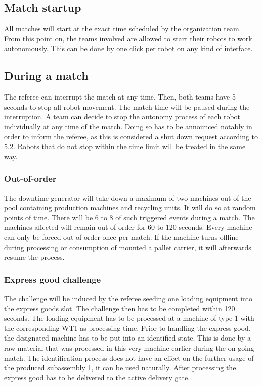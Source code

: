 \documentclass[12pt,twoside]{article}
\begin{document}
\subsection{Match startup}

All matches will start at the exact time scheduled by the organization
team. From this point on, the teams involved are allowed to start
their robots to work autonomously. This can be done by one click per
robot on any kind of interface.

\subsection{During a match}

The referee can interrupt the match at any time. Then, both teams have
5 seconds to stop all robot movement. The match time will be paused
during the interruption. A team can decide to stop the autonomy
process of each robot individually at any time of the match. Doing so
has to be announced notably in order to inform the referee, as this is
considered a shut down request according to 5.2. Robots that do not
stop within the time limit will be treated in the same way.

\subsubsection{Out-of-order}

The downtime generator will take down a maximum of two machines out of the pool containing production machines and recycling units. It will do so at random points of time. There will be 6 to 8 of such triggered events during a match. The machines affected will remain out of order for 60 to 120 seconds. Every machine can only be forced out of order once per match. If the machine turns offline during processing or consumption of mounted a pallet carrier, it will afterwards resume the process.

\subsubsection{Express good challenge}

The challenge will be induced by the referee seeding one loading
equipment into the express goods slot. The challenge then has to be
completed within 120 seconds. The loading equipment has to be
processed at a machine of type 1 with the corresponding WT1 as
processing time. Prior to handling the express good, the designated
machine has to be put into an identified state. This is done by a raw
material that was processed in this very machine earlier during the
on-going match. The identification process does not have an effect on
the further usage of the produced subassembly 1, it can be used
naturally. After processing the express good has to be delivered to
the active delivery gate.
\end{document}
